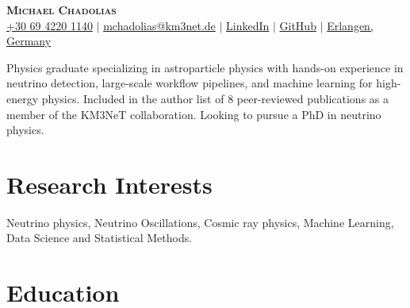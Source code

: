 \documentclass[letterpaper,11pt]{article}
\begin{document}

\begin{center}
    \textbf{\Huge \scshape Michael Chadolias} \\ \vspace{3pt}
    \small
    \faMobile \hspace{.5pt} \href{tel:00306942201140}{+30 69 4220 1140}
    $|$
    \faAt \hspace{.5pt} \href{mailto:mchadolias@km3net.de}{mchadolias@km3net.de}
    $|$
    \faLinkedinSquare \hspace{.5pt} \href{https://www.linkedin.com/in/michael-chadolias/}{LinkedIn}
    $|$
    \faGithub \hspace{.5pt} \href{https://github.com/mchadolias}{GitHub}
    $|$
    \faMapMarker \hspace{.5pt} \href{https://www.google.com/maps/place/Erlangen/@49.5892592,10.9020837,12z/data=!3m1!4b1!4m6!3m5!1s0x47a1f8c7d57c34a1:0x41eda32beb5c7d0!8m2!3d49.5896744!4d11.0119611!16zL20vMDFjel8x?entry=ttu}{Erlangen, Germany}
\end{center}

Physics graduate specializing in astroparticle physics with hands-on experience in neutrino detection, large-scale workflow pipelines, and machine learning for high-energy physics. Included in the author list of 8 peer-reviewed publications as a member of the KM3NeT collaboration. Looking to pursue a PhD in neutrino physics.
\vspace{1.5pt}


\section{Research Interests}
  \vspace{2pt}
  \resumeSubHeadingListStart
    \small{\item{
        {Neutrino physics, Neutrino Oscillations, Cosmic ray physics, Machine Learning, Data Science and Statistical Methods.} 
    }}
  \resumeSubHeadingListEnd

\section{Education}
  \vspace{3pt}
  \resumeSubHeadingListStart
    
\end{document}
